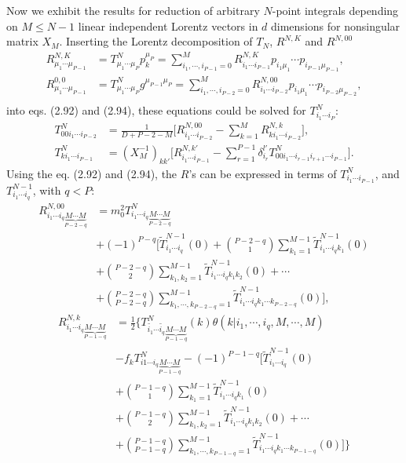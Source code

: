 Now we exhibit the results for reduction of arbitrary $N$-point integrals depending on $M\leq N-1$ linear independent Lorentz vectors in $d$ dimensions for nonsingular matrix $X_M$. Inserting the Lorentz decomposition of $T_N$, $R^{N,K}$ and $R^{N,00}$ 
\begin{align}
R^{N,K}_{\mu_1\cdots\mu_{P-1}}&=T^N_{\mu_1\cdots\mu_P}p^{\mu_P}_k=\sum_{i_1,\cdots,i_{P-1}=0}^{M} R^{N,K}_{i_1\cdots i_{P-1}}p_{i_1\mu_1}\cdots p_{i_{P-1}\mu_{P-1}},\nonumber\\
R^{0,0}_{\mu_1\cdots\mu_{P-1}}&=T^N_{\mu_1\cdots\mu_P}g^{\mu_{P-1}\mu_P}=\sum_{i_1,\cdots,i_{P-2}=0}^{M} R^{N,00}_{i_1\cdots i_{P-2}}p_{i_1\mu_1}\cdots p_{i_{P-2}\mu_{P-2}},\nonumber\\
\end{align} 
into eqs. (2.92) and (2.94), these equations could be solved for $T^N_{i_1\cdots i_P}$:
\begin{align}
T^N_{00i_1\cdots i_{P-2}}&=\frac{1}{D+P-2-M}\biggl[R^{N,00}_{i_1\cdots i_{P-2}}-\sum_{k=1}^{M}R^{N,k}_{ki_1\cdots i_{P-2}}\biggr],\nonumber\\
T^N_{ki_1\cdots i_{P-1}}&=(X^{-1}_M)_{kk'}\biggl[ R^{N,k'}_{i_1\cdots i_{P-1}}-\sum_{r=1}^{P-1}\delta^{l'}_{i_r}T^N_{00i_1\cdots i_{r-1}i_{r+1}\cdots i_{P-1}} \biggr].
\end{align}
Using the eq. (2.92) and (2.94), the $R$'s can be expressed in terms of $T^N_{i_1\cdots i_{P-1}}$, and $T^{N-1}_{i_1\cdots i_q}$, with $q<P$:
\begin{align}
R^{N,00}_{i_1\cdots i_q \underbrace{M\cdots M}_{P-2-q}}&=m^2_0 T^N_{i_1\cdots i_q \underbrace{M\cdots M}_{P-2-q}}\nonumber\\
&+(-1)^{P-q}\biggl[\widetilde{T}^{N-1}_{i_1\cdots i_q}(0)+\binom{P-2-q}{1}\sum_{k_1=1}^{M-1}\widetilde{T}^{N-1}_{i_1\cdots i_qk_1}(0) \nonumber\\
&+\binom{P-2-q}{2}\sum_{k_1,k_2=1}^{M-1}\widetilde{T}^{N-1}_{i_1\cdots i_qk_1k_2}(0)+\cdots \nonumber\\
&+\binom{P-2-q}{P-2-q}\sum_{k_1,\cdots,k_{P-2-q}=1}^{M-1}\widetilde{T}^{N-1}_{i_1\cdots i_qk_1\cdots k_{P-2-q}}(0)
\biggr],
\end{align} 
\begin{align}
R^{N,k}_{i_1\cdots i_q \underbrace{M\cdots M}_{P-1-q}}&=\frac{1}{2}\biggl\{  T^N_{\tilde{i_1}\cdots \tilde{i_q} \underbrace{M\cdots M}_{P-1-q}}(k)\theta(k|i_1,\cdots,i_q,M,\cdots,M)\nonumber\\
&-f_kT^N_{i1\cdots i_q\underbrace{M\cdots M}_{P-1-q}}-(-1)^{P-1-q}\biggl[\widetilde{T}^{N-1}_{i_1\cdots i_q}(0)\nonumber\\
&+\binom{P-1-q}{1}\sum_{k_1=1}^{M-1}\widetilde{T}^{N-1}_{i_1\cdots i_qk_1}(0) \nonumber\\
&+\binom{P-1-q}{2}\sum_{k_1,k_2=1}^{M-1}\widetilde{T}^{N-1}_{i_1\cdots i_qk_1k_2}(0)+\cdots \nonumber\\
&+\binom{P-1-q}{P-1-q}\sum_{k_1,\cdots,k_{P-1-q}=1}^{M-1}\widetilde{T}^{N-1}_{i_1\cdots i_qk_1\cdots k_{P-1-q}}(0)
\biggr]
\biggr\}
\end{align}
